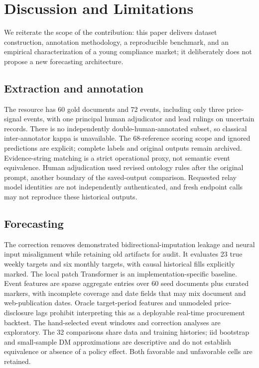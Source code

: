 \documentclass[sigconf,anonymous,review]{acmart}
\begin{document}


\section{Discussion and Limitations}
\label{sec:discussion}

We reiterate the scope of the contribution: this paper delivers dataset construction, annotation methodology, a reproducible benchmark, and an empirical characterization of a young compliance market; it deliberately does not propose a new forecasting architecture.

\subsection{Extraction and annotation}
The resource has 60 gold documents and 72 events, including only three price-signal events, with one principal human adjudicator and lead rulings on uncertain records. There is no independently double-human-annotated subset, so classical inter-annotator kappa is unavailable. The 68-reference scoring scope and ignored predictions are explicit; complete labels and original outputs remain archived. Evidence-string matching is a strict operational proxy, not semantic event equivalence. Human adjudication used revised ontology rules after the original prompt, another boundary of the saved-output comparison. Requested relay model identities are not independently authenticated, and fresh endpoint calls may not reproduce these historical outputs.

\subsection{Forecasting}
The correction removes demonstrated bidirectional-imputation leakage and neural input misalignment while retaining old artifacts for audit. It evaluates 23 true weekly targets and six monthly targets, with causal historical fills explicitly marked. The local patch Transformer is an implementation-specific baseline. Event features are sparse aggregate entries over 60 seed documents plus curated markers, with incomplete coverage and date fields that may mix document and web-publication dates. Oracle target-period features and unmodeled price-disclosure lags prohibit interpreting this as a deployable real-time procurement backtest. The hand-selected event windows and correction analyses are exploratory. The 32 comparisons share data and training histories; iid bootstrap and small-sample DM approximations are descriptive and do not establish equivalence or absence of a policy effect. Both favorable and unfavorable cells are retained.
\end{document}

